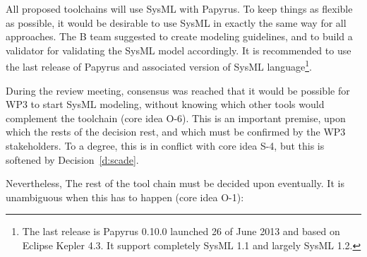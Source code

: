 
All proposed toolchains will use SysML with Papyrus.  To keep things as flexible as possible, it would be desirable to use SysML in exactly the same way for all approaches.  The B team suggested to create modeling guidelines, and to build a validator for validating the SysML model accordingly. It is recommended to use the last release of Papyrus and associated version of SysML  language\footnote{The last release is Papyrus 0.10.0 launched 26 of June 2013 and based on Eclipse Kepler 4.3. It support completely SysML 1.1 and largely SysML 1.2.}.


During the review meeting, consensus was reached that it would be possible for WP3 to start SysML modeling, without knowing which other tools would complement the toolchain (core idea O-6).  This is an important premise, upon which the rests of the decision rest, and which must be confirmed by the WP3 stakeholders. To a degree, this is in conflict with core idea S-4, but this is softened by Decision~\ref{d:scade}.


Nevertheless, The rest of the tool chain must be decided upon eventually.  It is unambiguous when this has to happen (core idea O-1):


